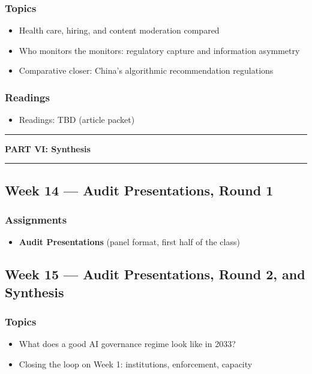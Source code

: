 \documentclass[12pt]{article}
\begin{document}
    \subsubsection*{Topics}
        \begin{itemize}
            \item Health care, hiring, and content moderation compared
            \item Who monitors the monitors: regulatory capture and information asymmetry
            \item Comparative closer: China's algorithmic recommendation regulations
        \end{itemize}
    \subsubsection*{Readings}
        \begin{itemize}
            \item Readings: TBD (article packet)
        \end{itemize}

\bigskip
\noindent\rule{\textwidth}{0.6pt}
\begin{center}\textbf{PART VI: Synthesis}\end{center}
\noindent\rule{\textwidth}{0.6pt}

\subsection*{Week 14 --- Audit Presentations, Round 1}
    \subsubsection*{Assignments}
        \begin{itemize}
            \item \textbf{Audit Presentations} (panel format, first half of the class)
        \end{itemize}

\subsection*{Week 15 --- Audit Presentations, Round 2, and Synthesis}
    \subsubsection*{Topics}
        \begin{itemize}
            \item What does a good AI governance regime look like in 2033?
            \item Closing the loop on Week 1: institutions, enforcement, capacity
        \end{itemize}
\end{document}
